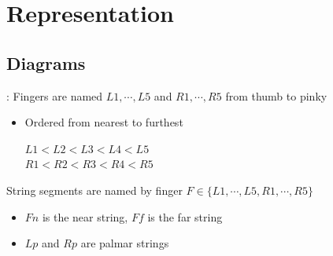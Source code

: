 \newcommand\w[1]{\texttt{[image: \#1]}}

\section{Representation}

\subsection{Diagrams}
\begin{frame}{\secname: \subsecname}
Fingers are named $L1,\cdots, L5$ and $R1,\cdots,R5$ from thumb to pinky

\begin{itemize}
    \item \pause Ordered from nearest to furthest
    \pause \begin{center}
    $L1\lt L2\lt L3\lt L4\lt L5$\\
    $R1\lt R2\lt R3\lt R4\lt R5$    
    \end{center}
\end{itemize}

\pause String segments are named by finger $F\in\{L1,\cdots, L5,R1,\cdots,R5\}$
\begin{itemize}[<+(1)->]
    \item $Fn$ is the near string, $Ff$ is the far string
    \item $Lp$ and $Rp$ are palmar strings
\end{itemize}

\pause
\begin{figure}\centering
\def\svgwidth{0.5\columnwidth}

\end{figure}
\end{frame}


